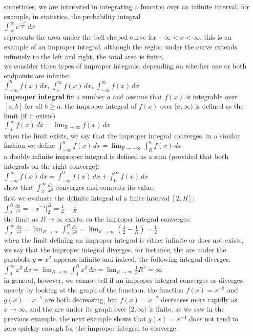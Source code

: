 \documentclass{article}
\begin{document}
sometimes, we are interested in integrating a function over an infinite interval. for example, in statistics, the probability integral\\ $\int_{\infty}^{\infty}e^{\frac{-x^2}{2}}\,dx$\\ represents the area under the bell-shaped curve for $-\infty < x < \infty$. this is an example of an improper integral. although the region under the curve extends infinitely to the left and right, the total area is finite.\\ we consider three types of improper integrals, depending on whether one or both endpoints are infinite:\\ $\int_{-\infty}^{b}f(x)\,dx$, $\int_{a}^{\infty}f(x)\,dx$, $\int_{-\infty}^{\infty}f(x)\,dx$\\

\textbf{improper integral} fix a number $a$ and assume that $f(x)$ is integrable over $[a, b]$ for all $b \geq a$. the improper integral of $f(x)$ over $[a, \infty)$ is defined as the limit (if it exists)\\
$\int_{a}^{\infty}f(x)\,dx = \lim_{R \to \infty}f(x)\,dx$\\
when the limit exists, we say that the improper integral converges. in a similar fashion we define $\int_{-\infty}^{a}f(x)\,dx = \lim_{R \to -\infty}\int_{R}^{a}f(x)\,dx$\\

a doubly infinite improper integral is defined as a sum (provided that both integrals on the right converge):\\
$\int_{-\infty}^{\infty}f(x)\,dx = \int_{-\infty}^{0}f(x)\,dx + \int_{0}^{\infty}f(x)\,dx$\\

show that $\int_{2}^{\infty}\frac{dx}{x^2}$ converges and compute its value.\\
first we evaluate the definite integral of a finite interval $[2, R]$: $\int_{2}^{R}\frac{dx}{x^2} = -x^{-1}\Big|_2^R = \frac{1}{2} - \frac{1}{R}$\\
the limit as $R \to \infty$ exists, so the improper integral converges:\\
$\int_{2}^{\infty}\frac{dx}{x^2} = \lim_{R \to \infty}\int_{2}^{R}\frac{dx}{x^2} = \lim_{R \to \infty}(\frac{1}{2} - \frac{1}{R}) = \frac{1}{2}$\\
when the limit defining an improper integral is either infinite or does not exists, we say that the improper integral diverges. for instance, the are under the parabola $y = x^2$ appears infinite and indeed, the following integral diverges:\\
$\int_{0}^{\infty}x^2\,dx = \lim_{R \to \infty}\int_{0}^{R}x^2\,dx = \lim_{R \to \infty}\frac{1}{3}R^3 = \infty$\\
in general, however, we cannot tell if an improper integral converges or diverges merely by looking at the graph of the function. the function $f(x) = x^{-2}$ and $g(x) = x^{-1}$ are both decreasing, but $f(x) = x^{-2}$ decreases more rapidly as $x \to \infty$, and the are under its graph over $[2, \infty)$ is finite, as we saw in the previous example. the next example shows that $g(x) = x^{-1}$ does not tend to zero quickly enough for the improper integral to converge.\\
\end{document}
